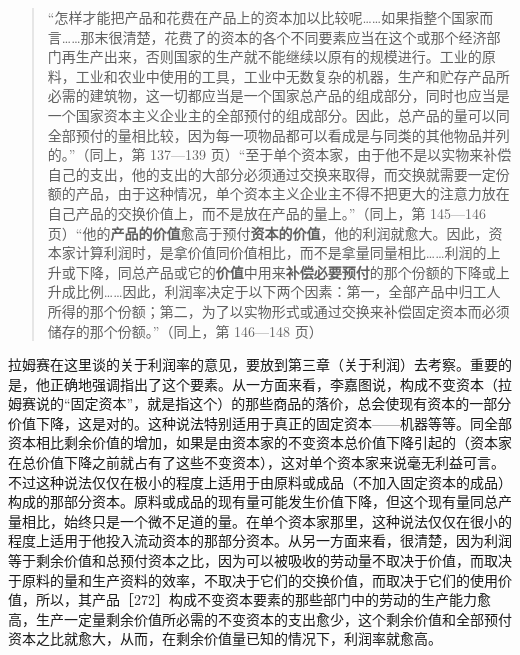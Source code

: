 \begin{quote}“怎样才能把产品和花费在产品上的资本加以比较呢……如果指整个国家而言……那末很清楚，花费了的资本的各个不同要素应当在这个或那个经济部门再生产出来，否则国家的生产就不能继续以原有的规模进行。工业的原料，工业和农业中使用的工具，工业中无数复杂的机器，生产和贮存产品所必需的建筑物，这一切都应当是一个国家总产品的组成部分，同时也应当是一个国家资本主义企业主的全部预付的组成部分。因此，总产品的量可以同全部预付的量相比较，因为每一项物品都可以看成是与同类的其他物品并列的。”（同上，第 137—139 页）“至于单个资本家，由于他不是以实物来补偿自己的支出，他的支出的大部分必须通过交换来取得，而交换就需要一定份额的产品，由于这种情况，单个资本主义企业主不得不把更大的注意力放在自己产品的交换价值上，而不是放在产品的量上。”（同上，第 145—146 页）“他的\textbf{产品的价值}愈高于预付\textbf{资本的价值}，他的利润就愈大。因此，资本家计算利润时，是拿价值同价值相比，而不是拿量同量相比……利润的上升或下降，同总产品或它的\textbf{价值}中用来\textbf{补偿必要预付}的那个份额的下降或上升成比例……因此，利润率决定于以下两个因素：第一，全部产品中归工人所得的那个份额；第二，为了以实物形式或通过交换来补偿固定资本而必须储存的那个份额。”（同上，第 146—148 页）\end{quote}

\fontbox{~\{}拉姆赛在这里谈的关于利润率的意见，要放到第三章（关于利润）去考察。重要的是，他正确地强调指出了这个要素。从一方面来看，李嘉图说，构成不变资本（拉姆赛说的“固定资本”，就是指这个）的那些商品的落价，总会使现有资本的一部分价值下降，这是对的。这种说法特别适用于真正的固定资本——机器等等。同全部资本相比剩余价值的增加，如果是由资本家的不变资本总价值下降引起的（资本家在总价值下降之前就占有了这些不变资本），这对单个资本家来说毫无利益可言。不过这种说法仅仅在极小的程度上适用于由原料或成品（不加入固定资本的成品）构成的那部分资本。原料或成品的现有量可能发生价值下降，但这个现有量同总产量相比，始终只是一个微不足道的量。在单个资本家那里，这种说法仅仅在很小的程度上适用于他投入流动资本的那部分资本。从另一方面来看，很清楚，因为利润等于剩余价值和总预付资本之比，因为可以被吸收的劳动量不取决于价值，而取决于原料的量和生产资料的效率，不取决于它们的交换价值，而取决于它们的使用价值，所以，其产品［272］构成不变资本要素的那些部门中的劳动的生产能力愈高，生产一定量剩余价值所必需的不变资本的支出愈少，这个剩余价值和全部预付资本之比就愈大，从而，在剩余价值量已知的情况下，利润率就愈高。\fontbox{\}~}

